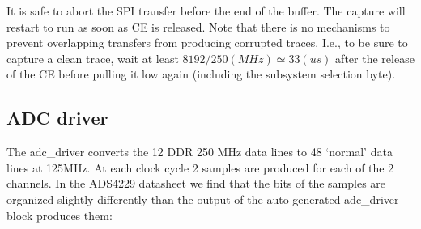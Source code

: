 \documentclass[a4paper,indent]{paper}
\begin{document}
It is safe to abort the \ac{SPI} transfer before the end of the buffer. The capture will restart to run as soon as CE is released. Note that there is no mechanisms to prevent overlapping transfers from producing corrupted traces. I.e., to be sure to capture a clean trace, wait at least $8192/250 (MHz) \simeq 33 (us)$ after the release of the CE before pulling it low again (including the subsystem selection byte).

\subsection{\acs{ADC} driver}
The adc\_driver converts the 12 \ac{DDR} 250 MHz data lines to 48 `normal' data lines at 125MHz.
At each clock cycle 2 samples are produced for each of the 2 channels.
In the ADS4229 datasheet we find that the bits of the samples are organized slightly differently than the output of the auto-generated adc\_driver block produces them:
\end{document}
